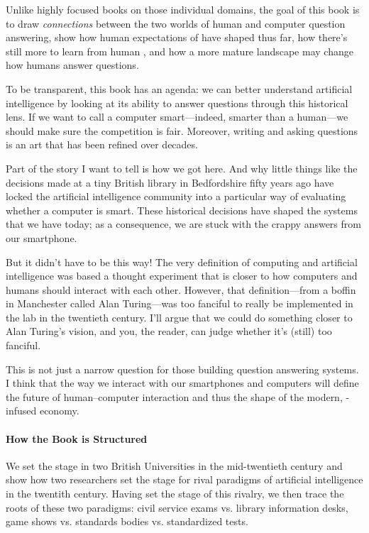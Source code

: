 Unlike highly focused books on those individual domains, the goal of this book is to
draw \emph{connections} between the two worlds of human and computer
question answering, show how human expectations of  have
shaped  thus far, how there's still more to learn from
human , and how a more mature  landscape may change
how humans answer questions.

To be transparent, this book has an agenda: we can better understand
artificial intelligence by looking at its ability to answer questions
through this historical lens.
%
If we want to call a computer smart---indeed, smarter than a
human---we should make sure the competition is fair.
%
Moreover, writing and asking questions is an art that has been refined
over decades.

Part of the story I want to tell is how we got here.
%
And why little things like the decisions made at a tiny British
library in Bedfordshire fifty years ago have locked the artificial
intelligence community into a particular way of evaluating whether a
computer is smart.
%
These historical decisions have shaped the systems that we have today;
as a consequence, we are stuck with the crappy answers from our
smartphone.

But it didn't have to be this way!
%
The very definition of computing and artificial intelligence was based a
thought experiment that is closer to how computers and humans should interact
with each other.
%
However, that definition---from a boffin in Manchester called Alan
Turing---was too fanciful to really be implemented in the lab in the
twentieth century.
%
I'll argue that we could do something closer to Alan Turing's vision,
and you, the reader, can judge whether it's (still) too fanciful.

This is not just a narrow question for those building question
answering systems.
%
I think that the way we interact with our smartphones and computers
will define the future of human--computer interaction and
thus the shape of the modern, -infused economy.

\paragraph{How the Book is Structured}

We set the stage in two British Universities in the mid-twentieth
century and show how two researchers set the stage for rival paradigms
of artificial intelligence in the twentith century.
%
Having set the stage of this rivalry, we then trace the roots of these
two paradigms: civil service exams vs. library information desks, game
shows vs. standards bodies vs. standardized tests.

